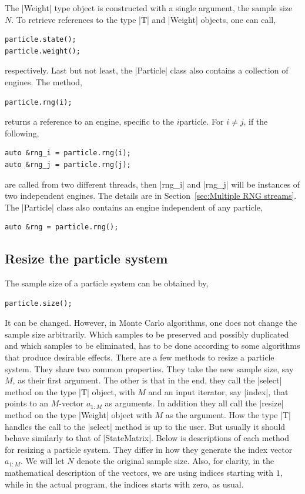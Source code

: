 The |Weight| type object is constructed with a single argument, the sample size
$N$. To retrieve references to the type |T| and |Weight| objects, one can call,
\begin{Verbatim}
particle.state();
particle.weight();
\end{Verbatim}
respectively. Last but not least, the |Particle| class also contains a
collection of \rng engines. The method,
\begin{Verbatim}
particle.rng(i);
\end{Verbatim}
returns a reference to an \rng engine, specific to the $i$\ith particle. For $i
\ne j$, if the following,
\begin{Verbatim}
auto &rng_i = particle.rng(i);
auto &rng_j = particle.rng(j);
\end{Verbatim}
are called from two different threads, then |rng_i| and |rng_j| will be
instances of two independent \rng engines. The details are in
Section~\ref{sec:Multiple RNG streams}. The |Particle| class also contains an
\rng engine independent of any particle,
\begin{Verbatim}
auto &rng = particle.rng();
\end{Verbatim}

\subsection{Resize the particle system}
\label{sub:Resize the particle system}

The sample size of a particle system can be obtained by,
\begin{Verbatim}
particle.size();
\end{Verbatim}
It can be changed. However, in Monte Carlo algorithms, one does not change the
sample size arbitrarily. Which samples to be preserved and possibly duplicated
and which samples to be eliminated, has to be done according to some algorithms
that produce desirable effects. There are a few methods to resize a particle
system. They share two common properties. They take the new sample size, say
$M$, as their first argument. The other is that in the end, they call the
|select| method on the type |T| object, with $M$ and an input iterator, say
|index|, that points to an $M$-vector $a_{1:M}$ as arguments. In addition they
all call the |resize| method on the type |Weight| object with $M$ as the
argument. How the type |T| handles the call to the |select| method is up to the
user. But usually it should behave similarly to that of |StateMatrix|. Below is
descriptions of each method for resizing a particle system. They differ in how
they generate the index vector $a_{1:M}$. We will let $N$ denote the original
sample size. Also, for clarity, in the mathematical description of the vectors,
we are using indices starting with $1$, while in the actual program, the
indices starts with zero, as usual.

